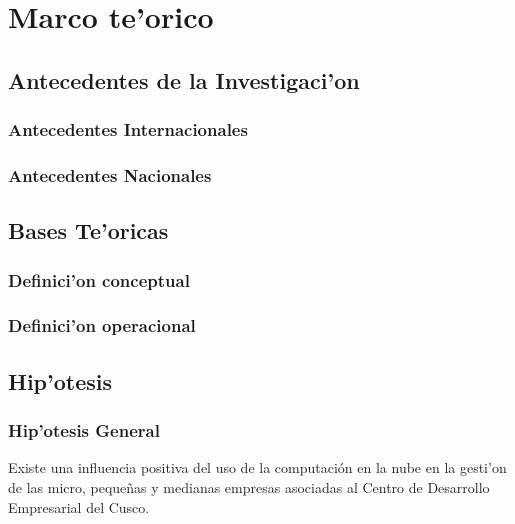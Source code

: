 %
%

\chapter{Marco te'orico}

\section{Antecedentes de la Investigaci'on}


\subsection{Antecedentes Internacionales}

\subsection{Antecedentes Nacionales}

\section{Bases Te'oricas}

\subsection{Definici'on conceptual}

\subsection{Definici'on operacional}

\section{Hip'otesis}

\subsection{Hip'otesis General}

Existe una influencia positiva del uso de la computaci\'on en la nube en la gesti'on de las micro, peque\~nas y medianas empresas asociadas al Centro de Desarrollo Empresarial del Cusco.

